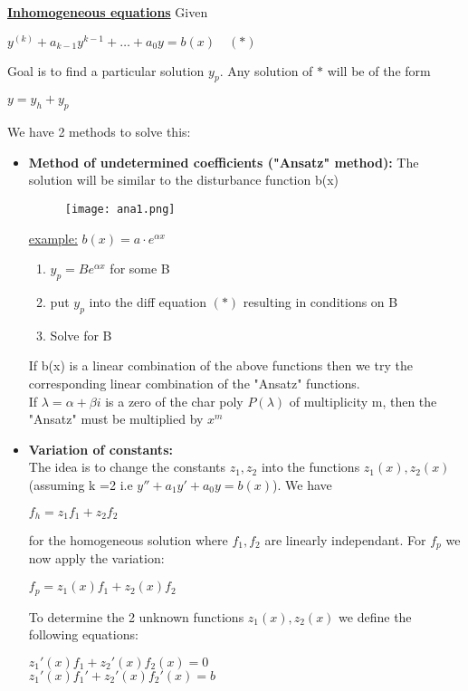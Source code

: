 \documentclass[8pt]{extreport}
\begin{document}
\underline{\textbf{Inhomogeneous equations}} Given
\begin{center}
$y^{(k)} + a_{k-1}y^{k-1} + \dots + a_0y = b(x) \quad (\ast)$
\end{center}
Goal is to find a particular solution $y_p$. Any solution of $\ast$ will be of the form
\begin{center}
$y =y_h + y_p$
\end{center}
We have 2 methods to solve this:
\begin{itemize}
\item \textbf{Method of undetermined coefficients ("Ansatz" method):}  The solution will be similar to the disturbance function b(x)
\begin{figure}[H]
\centering
\texttt{[image: ana1.png]}
\end{figure}
\underline{example:} $b(x) = a\cdot e^{\alpha x}$
\begin{enumerate}
\item $y_p = Be^{\alpha x}$ for some B
\item put $y_p$ into the diff equation $(\ast)$ resulting in conditions on B
\item Solve for B
\end{enumerate}
If b(x) is a linear combination of the above functions then we try the corresponding linear combination of the "Ansatz" functions.\\
If $\lambda = \alpha + \beta i$ is a zero of the char poly $P(\lambda)$ of multiplicity m, then the "Ansatz" must be multiplied by $x^m$
\item \textbf{Variation of constants:}\\The idea is to change the constants $z_1,z_2$ into the functions $z_1(x),z_2(x)$ (assuming k =2 i.e $y'' + a_1y' + a_0y = b(x)$). We have
\begin{center}
$f_h = z_1f_1 + z_2f_2$
\end{center}
for the homogeneous solution where $f_1,f_2$ are linearly independant.
For $f_p$ we now apply the variation:
\begin{center}
$f_p = z_1(x)f_1 + z_2(x)f_2$
\end{center}
To determine the 2 unknown functions $z_1(x),z_2(x)$ we define the following equations:
\begin{center}

$z_1'(x)f_1 + z_2'(x)f_2(x) = 0$\\[0.5em]
$z_1'(x)f_1' +z_2'(x)f_2'(x) = b$\\


\end{center}
\end{itemize}
\end{document}
